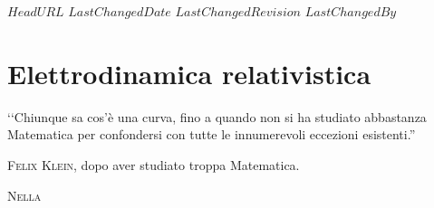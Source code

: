\svnidlong
{$HeadURL$}
{$LastChangedDate$}
{$LastChangedRevision$}
{$LastChangedBy$}

\chapter{Elettrodinamica relativistica}

\begin{introduction}
	‘‘Chiunque sa cos'è una curva, fino a quando non si ha studiato abbastanza Matematica per confondersi con tutte le innumerevoli eccezioni esistenti.''
	\begin{flushright}
		\textsc{Felix Klein,} dopo aver studiato troppa Matematica.
	\end{flushright}
\end{introduction}
\lettrine[findent=1pt, nindent=0pt]{N}{ella} 
